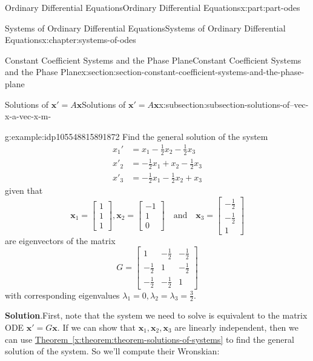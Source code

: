 \documentclass[twoside,10pt,]{book}
\newcommand{\blocktitlefont}{\relax}
\newcommand{\xreffont}{\relax}
\numberwithin{equation}{part}
\renewcommand{\vec}[1]{\mathbf{#1}}
\newcommand{\amp}{&}
\begin{document}
\begin{partptx}{Ordinary Differential Equations}{}{Ordinary Differential Equations}{}{}{x:part:part-odes}
\begin{chapterptx}{Systems of Ordinary Differential Equations}{}{Systems of Ordinary Differential Equations}{}{}{x:chapter:systems-of-odes}
\begin{sectionptx}{Constant Coefficient Systems and the Phase Plane}{}{Constant Coefficient Systems and the Phase Plane}{}{}{x:section:section-constant-coefficient-systems-and-the-phase-plane}
\begin{subsectionptx}{Solutions of \(\vec{x}' = A\vec{x}\)}{}{Solutions of \(\vec{x}' = A\vec{x}\)}{}{}{x:subsection:subsection-solutions-of--vec-x-a-vec-x-m-}
\begin{example}{}{g:example:idp105548815891872}
Find the general solution of the system%
\begin{align*}
x_{1}'  \amp = x_{1}-\frac{1}{2}x_{2}-\frac{1}{2}x_{3}\\
x'_{2}  \amp =  -\frac{1}{2}x_{1}+x_{2}-\frac{1}{2}x_{3}\\
x'_{3}  \amp =  -\frac{1}{2}x_{1}-\frac{1}{2}x_{2}+x_{3}
\end{align*}
given that%
\begin{equation*}
\vec{x}_{1} = \begin{bmatrix}1\\1\\1\end{bmatrix},\vec{x}_{2} = \begin{bmatrix}-1\\1\\0\end{bmatrix}\quad\text{and}\quad\vec{x}_{3} = \begin{bmatrix}-\frac{1}{2}\\-\frac{1}{2}\\1\end{bmatrix}
\end{equation*}
are eigenvectors of the matrix%
\begin{equation*}
G = \begin{bmatrix}1 \amp  -\frac{1}{2}  \amp  -\frac{1}{2}\\-\frac{1}{2}  \amp  1 \amp  -\frac{1}{2} \\ -\frac{1}{2}  \amp  -\frac{1}{2}  \amp    1\end{bmatrix}
\end{equation*}
with corresponding eigenvalues \(\lambda_{1} = 0,\lambda_{2} = \lambda_{3} = \frac{3}{2}\).%
\par\smallskip%
\noindent\textbf{\blocktitlefont Solution}.\hypertarget{g:solution:idp105548815894560}{}\quad{}First, note that the system we need to solve is equivalent to the matrix ODE \(\vec{x}' = G\vec{x}\). If we can show that \(\vec{x}_{1},\vec{x}_{2},\vec{x}_{3}\) are linearly independent, then we can use \hyperref[x:theorem:theorem-solutions-of-systems]{Theorem~{\xreffont\ref{x:theorem:theorem-solutions-of-systems}}} to find the general solution of the system. So we'll compute their Wronskian:%
\begin{align*}

\end{align*}
\end{example}
\end{subsectionptx}
\end{sectionptx}
\end{chapterptx}
\end{partptx}
\end{document}
